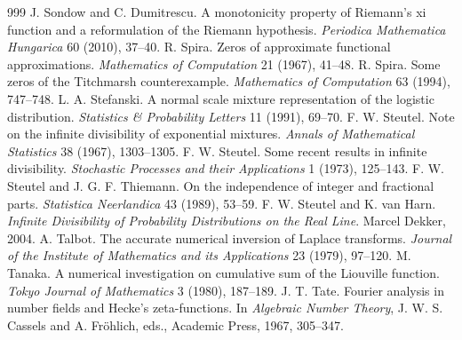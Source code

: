 \begin{thebibliography}{999}
 J. Sondow and C. Dumitrescu. A monotonicity property of Riemann's xi function and a reformulation of the Riemann hypothesis. \emph{Periodica Mathematica Hungarica} 60 (2010), 37--40.
 R. Spira. Zeros of approximate functional approximations. \emph{Mathematics of Computation} 21 (1967), 41--48.
 R. Spira. Some zeros of the Titchmarsh counterexample. \emph{Mathematics of Computation} 63 (1994), 747--748.
 L. A. Stefanski. A normal scale mixture representation of the logistic distribution. \emph{Statistics \& Probability Letters} 11 (1991), 69--70.
 F. W. Steutel. Note on the infinite divisibility of exponential mixtures. \emph{Annals of Mathematical Statistics} 38 (1967), 1303--1305.
 F. W. Steutel. Some recent results in infinite divisibility. \emph{Stochastic Processes and their Applications} 1 (1973), 125--143.
 F. W. Steutel and J. G. F. Thiemann. On the independence of integer and fractional parts. \emph{Statistica Neerlandica} 43 (1989), 53--59.
 F. W. Steutel and K. van Harn. \emph{Infinite Divisibility of Probability Distributions on the Real Line}. Marcel Dekker, 2004.
 A. Talbot. The accurate numerical inversion of Laplace transforms. \emph{Journal of the Institute of Mathematics and its Applications} 23 (1979), 97--120.
 M. Tanaka. A numerical investigation on cumulative sum of the Liouville function. \emph{Tokyo Journal of Mathematics} 3 (1980), 187--189.
 J. T. Tate. Fourier analysis in number fields and Hecke's zeta-functions. In \emph{Algebraic Number Theory}, J. W. S. Cassels and A. Fr\"ohlich, eds., Academic Press, 1967, 305--347.

\end{thebibliography}
